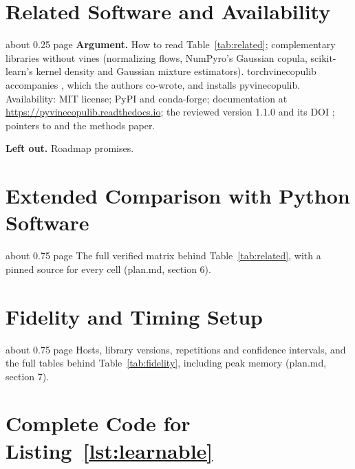 \documentclass[twoside,11pt]{article}
\newcommand{\pkg}[1]{\textsf{#1}}
\begin{document}
\section{Related Software and Availability}

\begin{plan}{about 0.25 page}
\textbf{Argument.} How to read Table~\ref{tab:related}; complementary
libraries without vines (normalizing flows, NumPyro's Gaussian copula,
scikit-learn's kernel density and Gaussian mixture estimators).
\pkg{torchvinecopulib} accompanies \citet{cheng2025vine}, which the authors
co-wrote, and installs \pkg{pyvinecopulib}. Availability: MIT license;
PyPI and conda-forge; documentation at
\url{https://pyvinecopulib.readthedocs.io}; the reviewed version 1.1.0 and its
DOI \citep{pyvinecopulib}; pointers to \citet{nagler2026rvinecopulib} and the
methods paper.

\textbf{Left out.} Roadmap promises.
\end{plan}


\newpage

\appendix

\section{Extended Comparison with Python Software}
\label{app:comparison}

\begin{plan}{about 0.75 page}
The full verified matrix behind Table~\ref{tab:related}, with a pinned source
for every cell (plan.md, section 6).
\end{plan}

\section{Fidelity and Timing Setup}
\label{app:setup}

\begin{plan}{about 0.75 page}
Hosts, library versions, repetitions and confidence intervals, and the full
tables behind Table~\ref{tab:fidelity}, including peak memory (plan.md,
section 7).
\end{plan}

\section{Complete Code for Listing~\ref{lst:learnable}}
\label{app:code}
\end{document}
